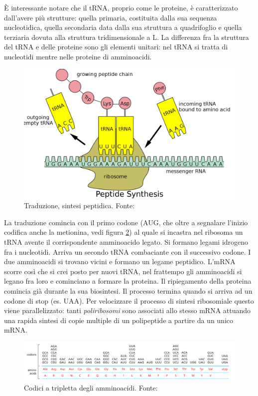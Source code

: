 \par È interessante notare che il tRNA, proprio come le proteine, è caratterizzato dall'avere più strutture: quella primaria, costituita dalla sua sequenza nucleotidica, quella secondaria data dalla sua struttura a quadrifoglio e quella terziaria dovuta alla struttura tridimensionale a L. La differenza fra la struttura del tRNA e delle proteine sono gli elementi unitari: nel tRNA si tratta di nucleotidi mentre nelle proteine di amminoacidi.

\begin{figure}[h]
	\centering
	\includegraphics[scale=0.15]{images/traduzione.png}
	\caption{Traduzione, sintesi peptidica. Fonte: \cite{tRNAwiki}}
	\label{fig:traduzione}
\end{figure}

La traduzione comincia con il primo codone (AUG, che oltre a segnalare l'inizio codifica anche la metionina, vedi figura \ref{fig:codici-amminoacidi}) al quale si incastra nel ribosoma un tRNA avente il corrispondente amminoacido legato. Si formano legami idrogeno fra i nucleotidi. Arriva un secondo tRNA combaciante con il successivo codone. I due amminoacidi si trovano vicini e formano un legame peptidico. L'mRNA scorre così che si crei posto per nuovi tRNA, nel frattempo gli amminoacidi si legano fra loro e cominciano a formare la proteina. Il ripiegamento della proteina comincia già durante la sua biosintesi. Il processo termina quando si arriva ad un codone di stop (es. UAA). Per velocizzare il processo di sintesi ribosomiale questo viene parallelizzato: tanti \textit{poliribosomi} sono associati allo stesso mRNA attuando una rapida sintesi di copie multiple di un polipeptide a partire da un unico mRNA.

\begin{figure}[h]
	\centering
	\includegraphics[scale=0.46]{images/codici-amminoacidi.png}
	\caption{Codici a tripletta degli amminoacidi. Fonte: \cite{alberts2018essential}}
	\label{fig:codici-amminoacidi}
\end{figure}

